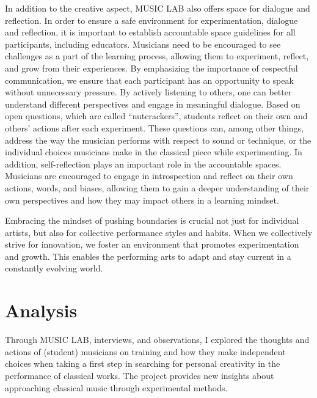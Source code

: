 \documentclass[authordate, empirical, issue]{jote-new-article}
\begin{document}
In addition to the creative aspect, MUSIC LAB also offers space for dialogue and reflection. In order to ensure a safe environment for experimentation, dialogue and reflection, it is important to establish accountable space guidelines for all participants, including educators. Musicians need to be encouraged to see challenges as a part of the learning process, allowing them to experiment, reflect, and grow from their experiences. By emphasizing the importance of respectful communication, we ensure that each participant has an opportunity to speak without unnecessary pressure. By actively listening to others, one can better understand different perspectives and engage in meaningful dialogue. Based on open questions, which are called “nutcrackers”, students reflect on their own and others' actions after each experiment. These questions can, among other things, address the way the musician performs with respect to sound or technique, or the individual choices musicians make in the classical piece while experimenting. In addition, self-reflection plays an important role in the accountable spaces. Musicians are encouraged to engage in introspection and reflect on their own actions, words, and biases, allowing them to gain a deeper understanding of their own perspectives and how they may impact others in a learning mindset.



Embracing the mindset of pushing boundaries is crucial not just for individual artists, but also for collective performance styles and habits. When we collectively strive for innovation, we foster an environment that promotes experimentation and growth. This enables the performing arts to adapt and stay current in a constantly evolving world.











\section{Analysis}



Through MUSIC LAB, interviews, and observations, I explored the thoughts and actions of (student) musicians on training and how they make independent choices when taking a first step in searching for personal creativity in the performance of classical works. The project provides new insights about approaching classical music through experimental methods.
\end{document}
